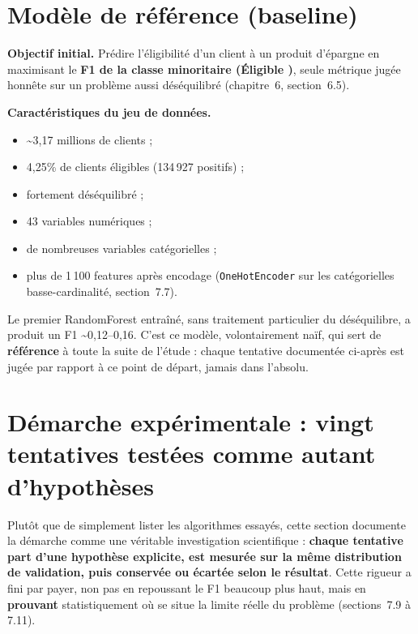 \documentclass[11pt,a4paper]{report}
\begin{document}
\section{Modèle de référence (baseline)}
\label{sec:baseline}
\textbf{Objectif initial.} Prédire l'éligibilité d'un client à un produit
d'épargne en maximisant le \textbf{F1 de la classe minoritaire
(\og Éligible \fg)}, seule métrique jugée honnête sur un problème aussi
déséquilibré (chapitre~6, section~6.5).

\textbf{Caractéristiques du jeu de données.}
\begin{itemize}
  \item \textasciitilde 3,17 millions de clients ;
  \item 4,25\% de clients éligibles (134\,927 positifs) ;
  \item fortement déséquilibré ;
  \item 43 variables numériques ;
  \item de nombreuses variables catégorielles ;
  \item plus de 1\,100 features après encodage (\texttt{OneHotEncoder} sur
  les catégorielles basse-cardinalité, section~7.7).
\end{itemize}

Le premier RandomForest entraîné, sans traitement particulier du
déséquilibre, a produit un F1 \textasciitilde 0,12--0,16. C'est ce modèle,
volontairement naïf, qui sert de \textbf{référence} à toute la suite de
l'étude : chaque tentative documentée ci-après est jugée par rapport à ce
point de départ, jamais dans l'absolu.

\section{Démarche expérimentale : vingt tentatives testées comme autant d'hypothèses}
\statutFait{}
Plutôt que de simplement lister les algorithmes essayés, cette section
documente la démarche comme une véritable investigation scientifique :
\textbf{chaque tentative part d'une hypothèse explicite, est mesurée sur
la même distribution de validation, puis conservée ou écartée selon le
résultat}. Cette rigueur a fini par payer, non pas en repoussant le F1
beaucoup plus haut, mais en \textbf{prouvant} statistiquement où se situe
la limite réelle du problème (sections~7.9 à 7.11).
\end{document}
